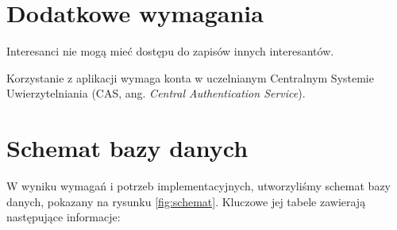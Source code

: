 \documentclass[licencjacka]{pracamgr}
\begin{document}
\section{Dodatkowe wymagania}
	\begin{step}
		\item Interesanci nie mogą mieć dostępu do zapisów innych interesantów.
		\item Korzystanie z aplikacji wymaga konta w uczelnianym Centralnym Systemie Uwierzytelniania (CAS, ang. \textit{Central Authentication Service}).
	\end{step}
		
\section{Schemat bazy danych}

W wyniku wymagań i potrzeb implementacyjnych, utworzyliśmy schemat bazy danych, pokazany na rysunku \ref{fig:schemat}. Kluczowe jej tabele zawierają następujące informacje:
\end{document}
